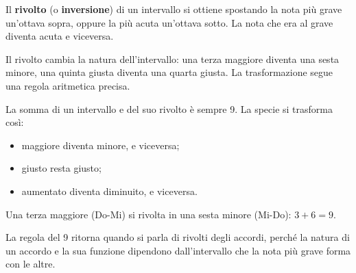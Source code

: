 \begin{definizione}
	\label{def:rivolto_intervallo}
	Il \textbf{rivolto} (o \textbf{inversione}) di un intervallo si ottiene spostando la nota più grave un'ottava sopra, oppure la più acuta un'ottava sotto. La nota che era al grave diventa acuta e viceversa.
\end{definizione}

Il rivolto cambia la natura dell'intervallo: una terza maggiore diventa una sesta minore, una quinta giusta diventa una quarta giusta. La trasformazione segue una regola aritmetica precisa.

\begin{regola}
	\label{reg:regola_del_9}
	La somma di un intervallo e del suo rivolto è sempre 9. La specie si trasforma così:
	\begin{itemize}
		\item maggiore diventa minore, e viceversa;
		\item giusto resta giusto;
		\item aumentato diventa diminuito, e viceversa.
	\end{itemize}
\end{regola}

\begin{esempio}
	\label{ex:inversione_intervallo}
	Una terza maggiore (Do-Mi) si rivolta in una sesta minore (Mi-Do): $3+6=9$.
\end{esempio}

La regola del 9 ritorna quando si parla di rivolti degli accordi, perché la natura di un accordo e la sua funzione dipendono dall'intervallo che la nota più grave forma con le altre.
